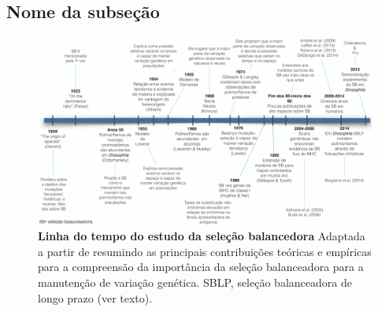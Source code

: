 \begin{refsection}
\subsection{\label{sub:tagpraisso}Nome da subseção}%
\begin{figure} 
\includegraphics{chap1_folder/Figures/Figura_linha_do_tempo_v2.png}
\caption{\textbf{Linha do tempo do estudo da seleção balancedora} Adaptada a partir de \textcite{Gloss2016} resumindo as principais contribuições teóricas e empíricas para a compreensão da importância da seleção balanceadora para a manutenção de variação genética. SBLP, seleção balanceadora de longo prazo (ver texto).} %
\label{fig:LinhadoTempo}
\end{figure} 
%




\end{refsection}
